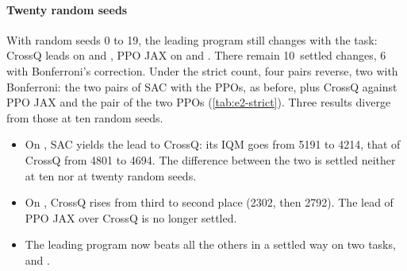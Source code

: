 
\paragraph{Twenty random seeds}
With random seeds 0 to 19, the leading program still changes with the task: CrossQ leads on
 and , PPO JAX on  and . There remain 10~settled
changes, 6 with Bonferroni's correction. Under the strict count, four pairs reverse, two with Bonferroni: the
two pairs of SAC with the PPOs, as before, plus CrossQ against PPO JAX and the pair of the two PPOs
(\cref{tab:e2-strict}). Three results diverge from those at ten random seeds.
\begin{itemize}
  \item On , SAC yields the lead to CrossQ: its IQM goes from \num{5191} to \num{4214}, that
    of CrossQ from \num{4801} to \num{4694}. The difference between the two is settled neither at ten nor at twenty
    random seeds.
  \item On , CrossQ rises from third to second place (\num{2302}, then \num{2792}). The lead of PPO
    JAX over CrossQ is no longer settled.
  \item The leading program now beats all the others in a settled way on two tasks,  and
    .
\end{itemize}

